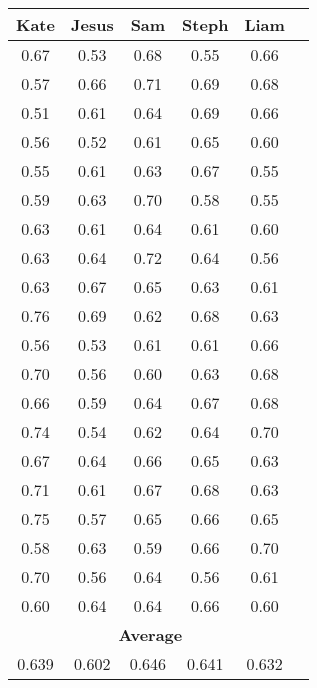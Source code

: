 \documentclass[11pt, letterpaper, includehead]{article}
\begin{document}
\begin{center}
  \begin{tabular}{|  c | c | c | c | c | c | }
    \hline
    \textbf{Kate} & \textbf{Jesus} & \textbf{Sam} & \textbf{Steph} & \textbf{Liam} \\
    \hline\hline
    0.67          & 0.53           & 0.68         & 0.55           & 0.66          \\
    \hline
    0.57          & 0.66           & 0.71         & 0.69           & 0.68          \\
    \hline
    0.51          & 0.61           & 0.64         & 0.69           & 0.66          \\
    \hline
    0.56          & 0.52           & 0.61         & 0.65           & 0.60          \\
    \hline
    0.55          & 0.61           & 0.63         & 0.67           & 0.55          \\
    \hline
    0.59          & 0.63           & 0.70         & 0.58           & 0.55          \\
    \hline
    0.63          & 0.61           & 0.64         & 0.61           & 0.60          \\
    \hline
    0.63          & 0.64           & 0.72         & 0.64           & 0.56          \\
    \hline
    0.63          & 0.67           & 0.65         & 0.63           & 0.61          \\
    \hline
    0.76          & 0.69           & 0.62         & 0.68           & 0.63          \\
    \hline
    0.56          & 0.53           & 0.61         & 0.61           & 0.66          \\
    \hline
    0.70          & 0.56           & 0.60         & 0.63           & 0.68          \\
    \hline
    0.66          & 0.59           & 0.64         & 0.67           & 0.68          \\
    \hline
    0.74          & 0.54           & 0.62         & 0.64           & 0.70          \\
    \hline
    0.67          & 0.64           & 0.66         & 0.65           & 0.63          \\
    \hline
    0.71          & 0.61           & 0.67         & 0.68           & 0.63          \\
    \hline
    0.75          & 0.57           & 0.65         & 0.66           & 0.65          \\
    \hline
    0.58          & 0.63           & 0.59         & 0.66           & 0.70          \\
    \hline
    0.70          & 0.56           & 0.64         & 0.56           & 0.61          \\
    \hline
    0.60          & 0.64           & 0.64         & 0.66           & 0.60          \\
    \hline
    \hline
    \multicolumn{5}{|c|}{\textbf{Average}} \\
    \hline
    0.639	& 0.602	& 0.646	& 0.641	& 0.632 \\
    \hline
  \end{tabular}
\end{center}
\end{document}

